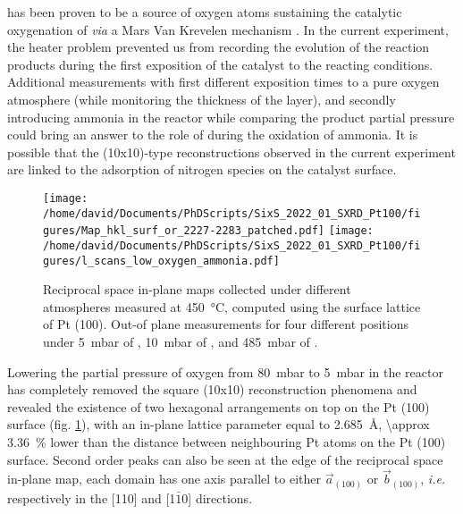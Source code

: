  has been proven to be a source of oxygen atoms sustaining the catalytic oxygenation of  \textit{via} a Mars Van Krevelen mechanism \parencite{Seriani2006, Seriani2008}.
In the current experiment, the heater problem prevented us from recording the evolution of the reaction products during the first exposition of the catalyst to the reacting conditions.
Additional measurements with first different exposition times to a pure oxygen atmosphere (while monitoring the thickness of the  layer), and secondly introducing ammonia in the reactor while comparing the product partial pressure could bring an answer to the role of  during the oxidation of ammonia.
It is possible that the (10x10)-type reconstructions observed in the current experiment are linked to the adsorption of nitrogen species on the catalyst surface.

\begin{figure}[!htb]
    \centering
    \texttt{[image: /home/david/Documents/PhDScripts/SixS\_2022\_01\_SXRD\_Pt100/figures/Map\_hkl\_surf\_or\_2227-2283\_patched.pdf]}
    \texttt{[image: /home/david/Documents/PhDScripts/SixS\_2022\_01\_SXRD\_Pt100/figures/l\_scans\_low\_oxygen\_ammonia.pdf]}
    \caption{
        Reciprocal space in-plane maps collected under different atmospheres measured at \qty{450}{\degreeCelsius}, computed using the surface lattice of Pt (100).
        Out-of plane measurements for four different positions under \qty{5}{\milli\bar} of , \qty{10}{\milli\bar} of , and \qty{485}{\milli\bar} of .
    }
    \label{fig:MapsAndLScansPt100LowOxAmmonia}
\end{figure}

Lowering the partial pressure of oxygen from \qty{80}{\milli\bar} to \qty{5}{\milli\bar} in the reactor has completely removed the square (10x10) reconstruction phenomena and revealed the existence of two hexagonal arrangements on top on the Pt (100) surface (fig. \ref{fig:MapsAndLScansPt100LowOxAmmonia}), with an in-plane lattice parameter equal to \qty{2.685}{\angstrom}, \qty{\approx 3.36}{\percent} lower than the distance between neighbouring Pt atoms on the Pt (100) surface.
Second order peaks can also be seen at the edge of the reciprocal space in-plane map, each domain has one axis parallel to either $\vec{a}_{(100)}$ or $\vec{b}_{(100)}$, \textit{i.e.} respectively in the [110] and [1$\bar{1}$0] directions.

